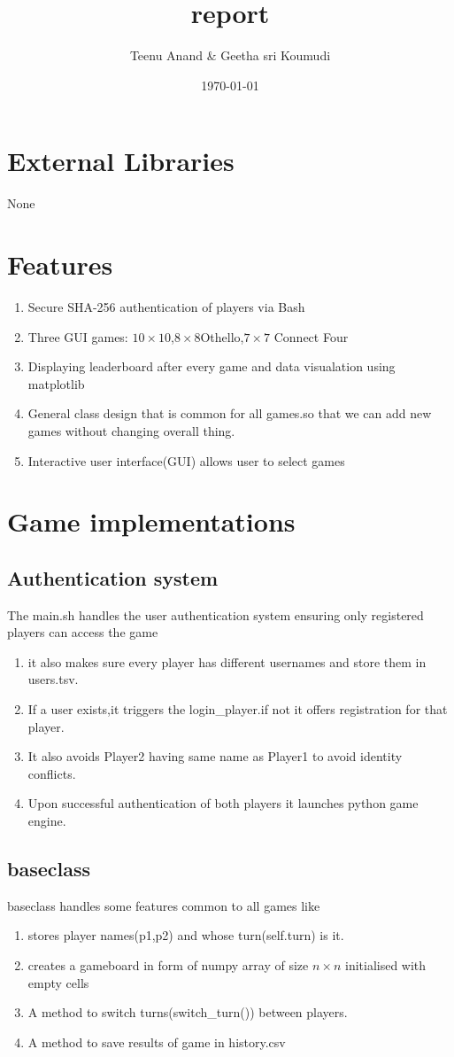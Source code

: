 \documentclass{article}
\title{report}
\author{Teenu Anand \& Geetha sri Koumudi}
\date{\today}
\begin{document}
\maketitle
\section{External Libraries}
 None
\section{Features}
\begin{enumerate}
    \item Secure SHA-256 authentication of players via Bash
    \item Three GUI games: $10 \times 10$,$8 \times 8$Othello,$7 \times 7$ Connect Four
    \item Displaying leaderboard after every game and data visualation using matplotlib
    \item General class design that is common for all games.so that we can add new games without changing overall thing.
    \item Interactive user interface(GUI) allows user to select games 
\end{enumerate}
\section{Game implementations}
\subsection{Authentication system}
The main.sh handles the user authentication system ensuring only registered players can access the game
\begin{enumerate}
    \item it also makes sure every player has different usernames and store them in users.tsv.
    \item If a user exists,it triggers the login\_player.if not it offers registration for that player.
    \item It also avoids Player2 having same name as Player1 to avoid identity conflicts. 
    \item Upon successful authentication of both players it launches python game engine.
\end{enumerate}
\subsection{baseclass}
baseclass handles some features common to all games like
\begin{enumerate}
    \item stores player names(p1,p2) and whose turn(self.turn) is it.
    \item creates a gameboard in form of numpy array of size $n \times n$ initialised with empty cells
    \item A method to switch turns(switch\_turn()) between players.
    \item A method to save results of game in history.csv
\end{enumerate}
\end{document}
